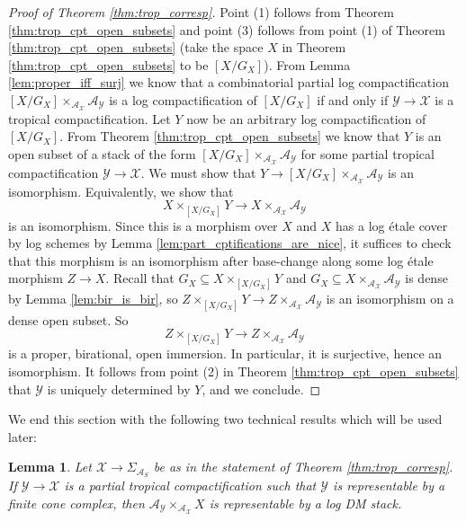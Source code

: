 \documentclass[11pt]{amsart}
\newtheorem{lemma}[theorem]{Lemma}
\theoremstyle{definition}
\theoremstyle{remark}
\begin{document}
\begin{proof}[Proof of Theorem \ref{thm:trop_corresp}]
	Point (1) follows from Theorem \ref{thm:trop_cpt_open_subsets} and point (3) follows from point (1)
	of Theorem \ref{thm:trop_cpt_open_subsets} (take the space $X$ in Theorem \ref{thm:trop_cpt_open_subsets} to be $[X/G_X]$). From Lemma \ref{lem:proper_iff_surj} we know that a combinatorial
	partial log compactification $[X/G_X]\times_{\mathcal{A}_{\mathcal{X}}}\mathcal{A}_{\mathcal{Y}}$ is a log compactification of $[X/G_X]$
	if and only if $\mathcal{Y}\to \mathcal{X}$ is a tropical compactification. Let $Y$ now be an arbitrary log compactification of $[X/G_X]$.
	From Theorem \ref{thm:trop_cpt_open_subsets} we know that $Y$ is an open subset of a stack of the
	form $[X/G_X]\times_{\mathcal{A}_{\mathcal{X}}}\mathcal{A}_{\mathcal{Y}}$ for some partial tropical compactification
	$\mathcal{Y}\to \mathcal{X}$. We must show that $Y\to [X/G_X]\times_{\mathcal{A}_{\mathcal{X}}}\mathcal{A}_{\mathcal{Y}}$
	is an isomorphism. Equivalently, we show that
	$$X\times_{[X/G_X]}Y\to X\times_{\mathcal{A}_{\mathcal{X}}}\mathcal{A}_{\mathcal{Y}}$$
	is an isomorphism. Since this is a morphism over $X$ and $X$ has a log étale cover by log schemes by
	Lemma \ref{lem:part_cptifications_are_nice}, it suffices to check that this morphism is an isomorphism
	after base-change along some log étale morphism $Z\to X$. Recall that $G_X\subseteq X\times_{[X/G_X]}Y$ and
	$G_X\subseteq X\times_{\mathcal{A}_{\mathcal{X}}}\mathcal{A}_{\mathcal{Y}}$ is dense by Lemma
	\ref{lem:bir_is_bir}, so $Z\times_{[X/G_X]}Y\to Z\times_{\mathcal{A}_{\mathcal{X}}}\mathcal{A}_{\mathcal{Y}}$
	is an isomorphism on a dense open subset. So
	$$Z\times_{[X/G_X]}Y\to Z\times_{\mathcal{A}_{\mathcal{X}}}\mathcal{A}_{\mathcal{Y}}$$
	is a proper, birational, open immersion. In particular, it is surjective, hence an isomorphism. It follows
	from point (2) in Theorem \ref{thm:trop_cpt_open_subsets} that $\mathcal{Y}$ is uniquely determined by $Y$,
	and we conclude.
\end{proof}

We end this section with the following two technical results which will be used later:

\begin{lemma}
	\label{lem:repr_when_cone_cx}
	Let $\mathcal{X}\to \Sigma_{\mathcal{A}_S}$ be as in the statement of Theorem \ref{thm:trop_corresp}.
	If $\mathcal{Y}\to \mathcal{X}$ is a partial tropical compactification such that $\mathcal{Y}$ is representable
	by a finite cone complex, then $\mathcal{A}_{\mathcal{Y}}\times_{\mathcal{A}_{\mathcal{X}}}X$ is representable by a log DM stack.
\end{lemma}
\end{document}
